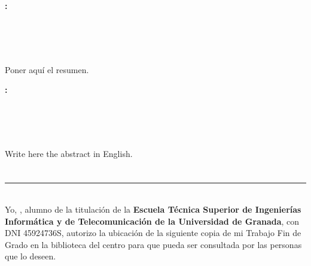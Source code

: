 \chapter*{}



\begin{center}
	\large\bfseries \myTitle: \mySubTitle \\
\end{center}
\begin{center}
	\myName\\
\end{center}

\\

\vspace{0.7cm}
\\

Poner aquí el resumen.

\cleardoublepage
\thispagestyle{empty}

\begin{center}
	\large\bfseries \myTitleENGLISH: \mySubTitleENGLISH \\
\end{center}
\begin{center}
	\myName \\
\end{center}

\\

\vspace{0.7cm}
\\

Write here the abstract in English.

\chapter*{}
\thispagestyle{empty}


\noindent\rule[-1ex]{\textwidth}{2pt}\\[4.5ex]

Yo, \textbf{\myName}, alumno de la titulación \myDegree de la \textbf{Escuela Técnica Superior
de Ingenierías Informática y de Telecomunicación de la Universidad de Granada}, con DNI 45924736S, autorizo la
ubicación de la siguiente copia de mi Trabajo Fin de Grado en la biblioteca del centro para que pueda ser
consultada por las personas que lo deseen.

